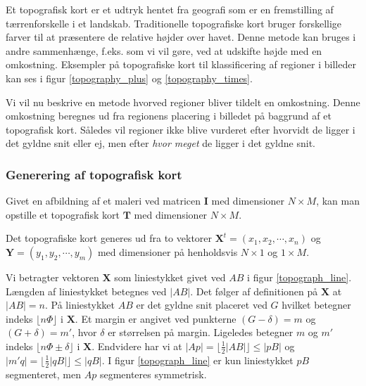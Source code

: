{
Et topografisk kort er et udtryk hentet fra geografi som er en
fremstilling af tærrenforskelle i et landskab. Traditionelle
topografiske kort bruger forskellige farver til at præsentere de
relative højder over havet. Denne metode kan bruges i andre sammenhænge,
f.eks. som vi vil gøre, ved at udskifte højde med en omkostning.
Eksempler på topografiske kort til klassificering af regioner i billeder
kan ses i figur \ref{topography_plus} og \ref{topography_times}.

Vi vil nu beskrive en metode hvorved regioner bliver tildelt en
omkostning. Denne omkostning beregnes ud fra regionens placering i
billedet på baggrund af et topografisk kort. Således vil regioner ikke
blive vurderet efter hvorvidt de ligger i det gyldne snit eller ej, men
efter \emph{hvor meget} de ligger i det gyldne snit.

\subsubsection*{Generering af topografisk kort}

Givet en afbildning af et maleri ved matricen $\mathbf{I}$ med dimensioner
$N \times{} M$, kan man opstille et topografisk kort $\mathbf{T}$ med dimensioner
$N \times{} M$.

Det topografiske kort generes ud fra to vektorer $\mathbf{X}^t =
\left(x_1, x_2, \cdots, x_n\right)$ og $\mathbf{Y} = \left(y_1, y_2,
\cdots, y_m\right)$ med dimensioner på henholdsvis $N \times 1$ og $1
\times M$.

Vi betragter vektoren $\mathbf{X}$ som liniestykket givet ved $AB$ i
figur \ref{topograph_line}. Længden af liniestykket betegnes ved $|AB|$.
Det følger af definitionen på $\mathbf{X}$ at $|AB| = n$. På liniestykket $AB$
er det gyldne snit placeret ved $G$ hvilket betegner indeks $\lfloor
n\varPhi \rfloor$ i $\mathbf{X}$. Et margin er angivet ved punkterne $(G
- \delta) = m$ og $(G + \delta) = m'$, hvor $\delta$ er størrelsen på
margin. Ligeledes betegner $m$ og $m'$ indeks $\lfloor n \varPhi \pm
\delta \rfloor$ i $\mathbf{X}$.  Endvidere har vi at $|Ap| = \lfloor
\frac{1}{2}|AB| \rfloor \leq |pB|$ og $|m'q| = \lfloor \frac{1}{2}|qB|
\rfloor \leq |qB|$. I figur \ref{topograph_line} er kun liniestykket
$pB$ segmenteret, men $Ap$ segmenteres symmetrisk.

}
